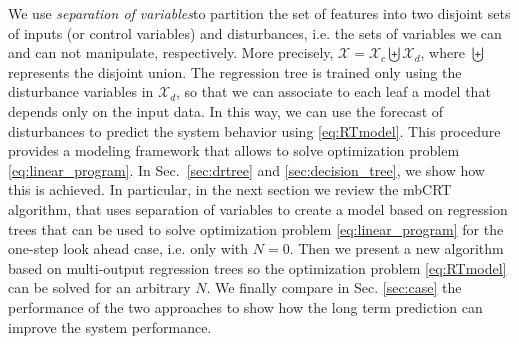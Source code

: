We use \emph{separation of variables}to partition the set of features into two disjoint sets of inputs (or control variables) and disturbances, i.e. the sets of variables we can and can not manipulate, respectively. 
More precisely, $\mathcal{X} = \mathcal{X}_c\biguplus\mathcal{X}_d$, where $\biguplus$ represents the disjoint union. 
The regression tree is trained only using the disturbance variables in $\mathcal{X}_d$, so that we can associate to each leaf a model that depends only on the input data. 
In this way, we can use the forecast of disturbances to predict the system behavior using \eqref{eq:RTmodel}. This procedure provides a modeling framework that allows to solve optimization problem \eqref{eq:linear_program}. 
In Sec.~\ref{sec:drtree} and \ref{sec:decision_tree}, we show how this is achieved. 
In particular, in the next section we review the mbCRT algorithm, that uses separation of variables to create a model based on regression trees that can be used to solve optimization problem \eqref{eq:linear_program} for the one-step look ahead case, i.e. only with $N=0$. 
Then we present a new algorithm based on multi-output regression trees so the optimization problem \eqref{eq:RTmodel} can be solved for an arbitrary $N$. 
We finally compare in Sec. \ref{sec:case} the performance of the two approaches to show how the long term prediction can improve the system performance.
